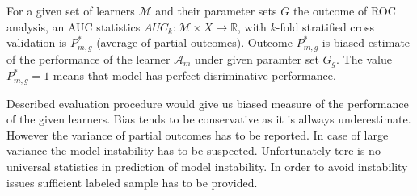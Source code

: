 For a given set of learners $\mathcal{M}$ and their parameter sets $G$ the outcome of 
ROC analysis, an AUC statistics $AUC_k : \mathcal{M} \times X \rightarrow \mathbb{R} $, with $k$-fold stratified 
cross validation is $P_{m,g}^*$  (average of partial outcomes). 
Outcome $P_{m,g}^*$ is biased estimate of the performance 
of the learner $\mathcal{A}_m$ under given paramter set $G_g$.
The value $P_{m,g}^*=1$ means that model has perfect disriminative performance.

Described evaluation procedure would give us biased measure of the performance of the
given learners. Bias tends to be conservative as it is allways underestimate.
However the variance of partial outcomes has to be reported. In case of large variance
the model instability has to be suspected. Unfortunately tere is no universal statistics in
prediction of model instability. In order to avoid instability issues sufficient labeled
sample has to be provided.


 
 
 


